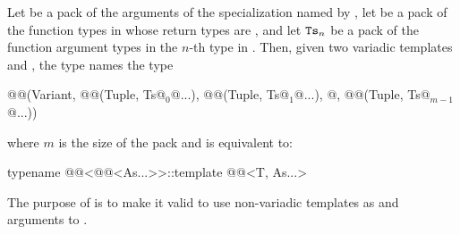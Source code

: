 \pnum
Let  be a pack of the arguments of
the  specialization named by ,
let  be a pack of the function types in 
whose return types are , and
let $\tcode{Ts}_n$ be a pack of the function argument types
in the $n$-th type in .
Then, given two variadic templates  and ,
the type 
names the type
\begin{codeblock}
@@(Variant, @@(Tuple, Ts@$_0$@...),
                    @\itcorr[1]@(Tuple, Ts@$_1$@...),
                    @\itcorr[1]\ldots@,
                    @\itcorr[1]@(Tuple, Ts@$_{m-1}$@...))
\end{codeblock}
where $m$ is the size of the pack  and
 is equivalent to:
\begin{codeblock}
typename @@<@@<As...>>::template @@<T, As...>
\end{codeblock}

\pnum
\begin{note}
The purpose of  is to make it valid
to use non-variadic templates as  and  arguments
to .
\end{note}

